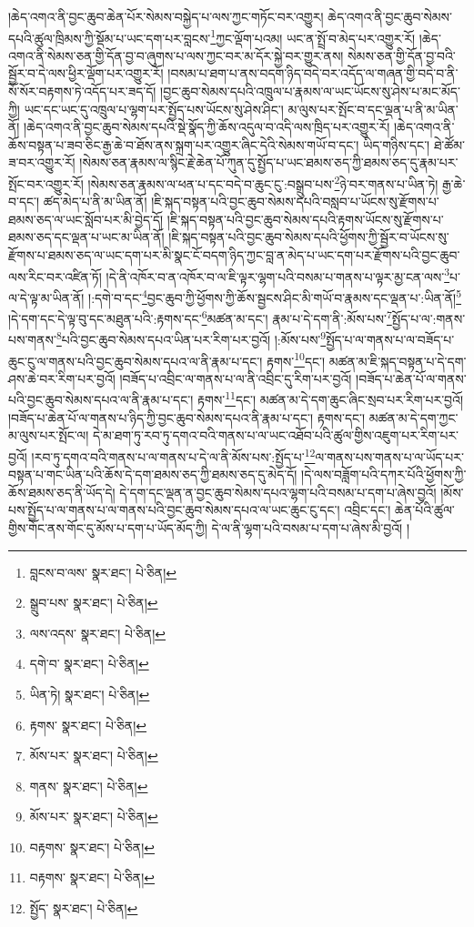 །ཆེད་འགའ་ནི་བྱང་ཆུབ་ཆེན་པོར་སེམས་བསྐྱེད་པ་ལས་ཀྱང་གཏོང་བར་འགྱུར། ཆེད་འགའ་ནི་བྱང་ཆུབ་སེམས་དཔའི་ཚུལ་ཁྲིམས་ཀྱི་སྡོམ་པ་ཡང་དག་པར་བླངས་\footnote{བླངས་བ་ལས་  སྣར་ཐང་།  པེ་ཅིན། }ཀྱང་ལྡོག་པའམ། ཡང་ན་སྤྲོ་བ་མེད་པར་འགྱུར་རོ། །ཆེད་འགའ་ནི་སེམས་ཅན་གྱི་དོན་བྱ་བ་ཞུགས་པ་ལས་ཀྱང་བར་མ་དོར་སྐྱེ་བར་གྱུར་ནས། སེམས་ཅན་གྱི་དོན་བྱ་བའི་སྦྱོར་བ་དེ་ལས་ཕྱིར་ལྡོག་པར་འགྱུར་རོ། །བསམ་པ་ཐག་པ་ནས་བདག་ཉིད་བདེ་བར་འདོད་ལ་གཞན་གྱི་བདེ་བ་ནི་སོ་སོར་བརྟགས་ཏེ་འདོད་པར་ཟད་དོ། །བྱང་ཆུབ་སེམས་དཔའི་འཁྲུལ་པ་རྣམས་ལ་ཡང་ཡོངས་སུ་ཤེས་པ་མང་མོད་ཀྱི། ཡང་དང་ཡང་དུ་འཁྲུལ་པ་ལྷག་པར་སྤྱོད་པས་ཡོངས་སུ་ཤེས་ཤིང་། མ་ལུས་པར་སྤོང་བ་དང་ལྡན་པ་ནི་མ་ཡིན་ནོ། །ཆེད་འགའ་ནི་བྱང་ཆུབ་སེམས་དཔའི་སྡེ་སྣོད་ཀྱི་ཆོས་འདུལ་བ་འདི་ལས་ཁྲིད་པར་འགྱུར་རོ། །ཆེད་འགའ་ནི་ཆོས་བསྟན་པ་ཟབ་ཅིང་རྒྱ་ཆེ་བ་ཐོས་ནས་སྐྲག་པར་འགྱུར་ཞིང་དེའི་སེམས་གཡོ་བ་དང་། ཡིད་གཉིས་དང་། ཐེ་ཚོམ་ཟ་བར་འགྱུར་རོ། །སེམས་ཅན་རྣམས་ལ་སྙིང་རྗེ་ཆེན་པོ་ཀུན་དུ་སྤྱོད་པ་ཡང་ཐམས་ཅད་ཀྱི་ཐམས་ཅད་དུ་རྣམ་པར་སྤོང་བར་འགྱུར་རོ། །སེམས་ཅན་རྣམས་ལ་ཕན་པ་དང་བདེ་བ་ཆུང་ངུ་:བསྒྲུབ་པས་\footnote{སྒྲུབ་པས་  སྣར་ཐང་།  པེ་ཅིན། }ཉེ་བར་གནས་པ་ཡིན་ཏེ། རྒྱ་ཆེ་བ་དང་། ཚད་མེད་པ་ནི་མ་ཡིན་ནོ། །ཇི་སྐད་བསྟན་པའི་བྱང་ཆུབ་སེམས་དཔའི་བསླབ་པ་ཡོངས་སུ་རྫོགས་པ་ཐམས་ཅད་ལ་ཡང་སློབ་པར་མི་བྱེད་དོ། །ཇི་སྐད་བསྟན་པའི་བྱང་ཆུབ་སེམས་དཔའི་རྟགས་ཡོངས་སུ་རྫོགས་པ་ཐམས་ཅད་དང་ལྡན་པ་ཡང་མ་ཡིན་ནོ། །ཇི་སྐད་བསྟན་པའི་བྱང་ཆུབ་སེམས་དཔའི་ཕྱོགས་ཀྱི་སྦྱོར་བ་ཡོངས་སུ་རྫོགས་པ་ཐམས་ཅད་ལ་ཡང་དག་པར་མི་སྣང་ངོ་བདག་ཉིད་ཀྱང་བླ་ན་མེད་པ་ཡང་དག་པར་རྫོགས་པའི་བྱང་ཆུབ་ལས་རིང་བར་འཛིན་ཏོ། །དེ་ནི་འཁོར་བ་ན་འཁོར་བ་ལ་ཇི་ལྟར་ལྷག་པའི་བསམ་པ་གནས་པ་ལྟར་མྱ་ངན་ལས་\footnote{ལས་འདས་  སྣར་ཐང་།  པེ་ཅིན། }པ་ལ་དེ་ལྟ་མ་ཡིན་ནོ། །:དགེ་བ་དང་\footnote{དགེ་བ་  སྣར་ཐང་།  པེ་ཅིན། }བྱང་ཆུབ་ཀྱི་ཕྱོགས་ཀྱི་ཆོས་སྦྱངས་ཤིང་མི་གཡོ་བ་རྣམས་དང་ལྡན་པ་:ཡིན་ནོ།\footnote{ཡིན་ཏེ།  སྣར་ཐང་།  པེ་ཅིན། } །དེ་དག་དང་དེ་ལྟ་བུ་དང་མཐུན་པའི་:རྟགས་དང་\footnote{རྟགས་  སྣར་ཐང་།  པེ་ཅིན། }མཚན་མ་དང་། རྣམ་པ་དེ་དག་ནི་:མོས་པས་\footnote{མོས་པར་  སྣར་ཐང་།  པེ་ཅིན། }སྤྱོད་པ་ལ་:གནས་པས་གནས་\footnote{གནས་  སྣར་ཐང་།  པེ་ཅིན། }པའི་བྱང་ཆུབ་སེམས་དཔའ་ཡིན་པར་རིག་པར་བྱའོ། །:མོས་པས་\footnote{མོས་པར་  སྣར་ཐང་།  པེ་ཅིན། }སྤྱོད་པ་ལ་གནས་པ་ལ་བཟོད་པ་ཆུང་ངུ་ལ་གནས་པའི་བྱང་ཆུབ་སེམས་དཔའ་ལ་ནི་རྣམ་པ་དང་། རྟགས་\footnote{བརྟགས་  སྣར་ཐང་།  པེ་ཅིན། }དང་། མཚན་མ་ཇི་སྐད་བསྟན་པ་དེ་དག་ཤས་ཆེ་བར་རིག་པར་བྱའོ། །བཟོད་པ་འབྲིང་ལ་གནས་པ་ལ་ནི་འབྲིང་དུ་རིག་པར་བྱའོ། །བཟོད་པ་ཆེན་པོ་ལ་གནས་པའི་བྱང་ཆུབ་སེམས་དཔའ་ལ་ནི་རྣམ་པ་དང་། རྟགས་\footnote{བརྟགས་  སྣར་ཐང་།  པེ་ཅིན། }དང་། མཚན་མ་དེ་དག་ཆུང་ཞིང་སྲབ་པར་རིག་པར་བྱའོ། །བཟོད་པ་ཆེན་པོ་ལ་གནས་པ་ཉིད་ཀྱི་བྱང་ཆུབ་སེམས་དཔའ་ནི་རྣམ་པ་དང་། རྟགས་དང་། མཚན་མ་དེ་དག་ཀྱང་མ་ལུས་པར་སྤོང་ལ། དེ་མ་ཐག་ཏུ་རབ་ཏུ་དགའ་བའི་གནས་པ་ལ་ཡང་འཐོབ་པའི་ཚུལ་གྱིས་འཇུག་པར་རིག་པར་བྱའོ། །རབ་ཏུ་དགའ་བའི་གནས་པ་ལ་གནས་པ་དེ་ལ་ནི་མོས་པས་:སྤྱོད་པ་\footnote{སྤྱོད་  སྣར་ཐང་།  པེ་ཅིན། }ལ་གནས་པས་གནས་པ་ལ་ཡོད་པར་བསྟན་པ་གང་ཡིན་པའི་ཆོས་དེ་དག་ཐམས་ཅད་ཀྱི་ཐམས་ཅད་དུ་མེད་དོ། །དེ་ལས་བཟློག་པའི་དཀར་པོའི་ཕྱོགས་ཀྱི་ཆོས་ཐམས་ཅད་ནི་ཡོད་དེ། དེ་དག་དང་ལྡན་ན་བྱང་ཆུབ་སེམས་དཔའ་ལྷག་པའི་བསམ་པ་དག་པ་ཞེས་བྱའོ། །མོས་པས་སྤྱོད་པ་ལ་གནས་པ་ལ་གནས་པའི་བྱང་ཆུབ་སེམས་དཔའ་ལ་ཡང་ཆུང་ངུ་དང་། འབྲིང་དང་། ཆེན་པོའི་ཚུལ་གྱིས་གོང་ནས་གོང་དུ་མོས་པ་དག་པ་ཡོད་མོད་ཀྱི། དེ་ལ་ནི་ལྷག་པའི་བསམ་པ་དག་པ་ཞེས་མི་བྱའོ། །
